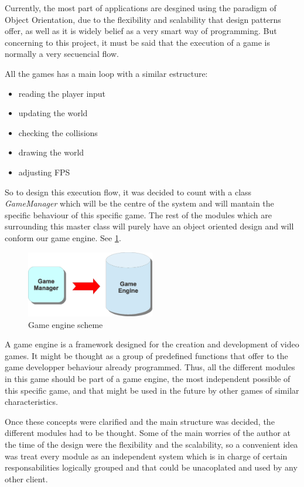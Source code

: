 \documentclass[]{article}
\begin{document}
Currently, the most part of applications are desgined using the paradigm of Object Orientation, due to the flexibility and scalability that design patterns offer, as well as it is widely belief
as a very smart way of programming. But concerning to this project, it must be said that the execution of a game is normally a very secuencial flow.

All the games has a main loop with a similar estructure:
\begin{itemize}
 \item reading the player input
 \item updating the world
 \item checking the collisions
 \item drawing the world
 \item adjusting FPS
\end{itemize}

So to design this execution flow, it was decided to count with a class \emph{GameManager} which will be the centre of the system and will mantain the specific behaviour of this specific game. 
The rest of the modules which are surrounding this master class will purely have an object oriented design and will conform our game engine. See \ref{fig:ge}.

\begin{figure}[h]
\begin{center}
\includegraphics[width=0.5\textwidth]{images/gameEngine.eps}
\caption{Game engine scheme}
\label{fig:ge}
\end{center}
\end{figure}

A game engine is a framework designed for the creation and development of video games. It might be thought as a group of predefined functions that offer to the game developper behaviour
already programmed. Thus, all the different modules in this game should be part of a game engine, the most independent possible of this specific game, and that might be used in the future by
other games of similar characteristics.

Once these concepts were clarified and the main structure was decided, the different modules had to be thought. Some of the main worries of the author at the time of the design were the flexibility
and the scalability, so a convenient idea was treat every module as an independent system which is in charge of certain responsabilities logically grouped and that could be unacoplated and used by any
other client. 
\end{document}
